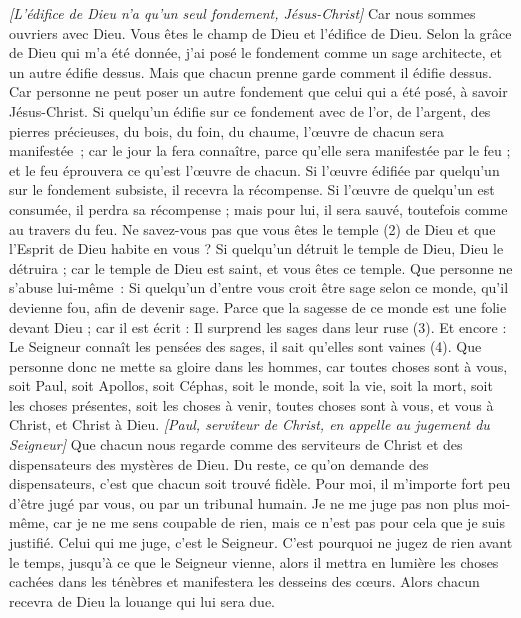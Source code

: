 \begin{multicols}{2}
\textit{[L'édifice de Dieu n'a qu'un seul fondement, Jésus-Christ]}
Car nous sommes ouvriers avec Dieu. Vous êtes le champ de Dieu et l'édifice de Dieu.
Selon la grâce de Dieu qui m'a été donnée, j'ai posé le fondement comme un sage architecte, et un autre édifie dessus. Mais que chacun prenne garde comment il édifie dessus.
Car personne ne peut poser un autre fondement que celui qui a été posé, à savoir Jésus-Christ.
Si quelqu'un édifie sur ce fondement avec de l'or, de l'argent, des pierres précieuses, du bois, du foin, du chaume, l’œuvre de chacun sera manifestée ;
car le jour la fera connaître, parce qu'elle sera manifestée par le feu ; et le feu éprouvera ce qu’est l’œuvre de chacun.
Si l’œuvre édifiée par quelqu’un sur le fondement subsiste, il recevra la récompense.
Si l’œuvre de quelqu'un est consumée, il perdra sa récompense ; mais pour lui, il sera sauvé, toutefois comme au travers du feu.
Ne savez-vous pas que vous êtes le temple (2) de Dieu et que l’Esprit de Dieu habite en vous ?
Si quelqu'un détruit le temple de Dieu, Dieu le détruira ; car le temple de Dieu est saint, et vous êtes ce temple.
Que personne ne s'abuse lui-même : Si quelqu'un d'entre vous croit être sage selon ce monde, qu'il devienne fou, afin de devenir sage.
Parce que la sagesse de ce monde est une folie devant Dieu ; car il est écrit : Il surprend les sages dans leur ruse (3).
Et encore : Le Seigneur connaît les pensées des sages, il sait qu’elles sont vaines (4).
Que personne donc ne mette sa gloire dans les hommes, car toutes choses sont à vous,
soit Paul, soit Apollos, soit Céphas, soit le monde, soit la vie, soit la mort, soit les choses présentes, soit les choses à venir, toutes choses sont à vous,
et vous à Christ, et Christ à Dieu.
\textit{[Paul, serviteur de Christ, en appelle au jugement du Seigneur]}
\VerseOne{}Que chacun nous regarde comme des serviteurs de Christ et des dispensateurs des mystères de Dieu.
Du reste, ce qu’on demande des dispensateurs, c’est que chacun soit trouvé fidèle.
Pour moi, il m’importe fort peu d'être jugé par vous, ou par un tribunal humain. Je ne me juge pas non plus moi-même, car je ne me sens coupable de rien,
mais ce n’est pas pour cela que je suis justifié. Celui qui me juge, c'est le Seigneur.
C'est pourquoi ne jugez de rien avant le temps, jusqu'à ce que le Seigneur vienne, alors il mettra en lumière les choses cachées dans les ténèbres et manifestera les desseins des cœurs. Alors chacun recevra de Dieu la louange qui lui sera due.

\end{multicols}

